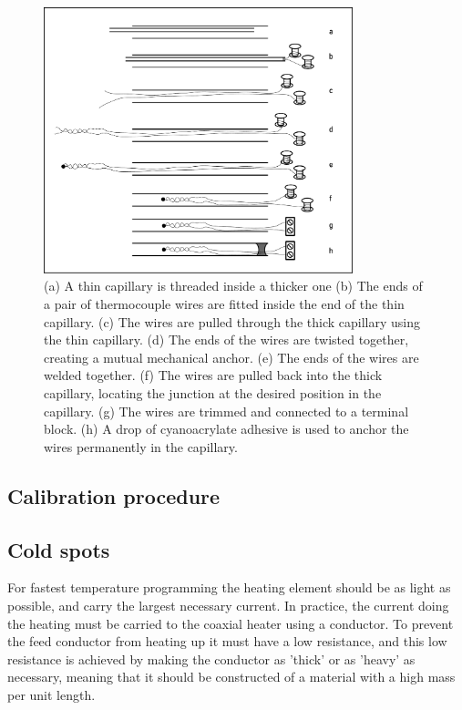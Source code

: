 \begin{figure}
	\centering
	\includegraphics[width=0.8\textwidth]{./Figures/FineWireThermocouple.pdf}
	\decoRule
	
\caption[A cartoon explaining how to construct a long, thin thermocouple
probe.]{(a) A thin capillary is threaded inside a thicker one (b) The ends of a
pair of thermocouple wires are fitted inside the end of the thin capillary. (c)
The wires are pulled through the thick capillary using the thin capillary. (d)
The ends of the wires are twisted together, creating a mutual mechanical anchor.
(e) The ends of the wires are welded together. (f) The wires are pulled back
into the thick capillary, locating the junction at the desired position in the
capillary. (g) The wires are trimmed and connected to a terminal block. (h) A
drop of cyanoacrylate adhesive is used to anchor the wires permanently in the
capillary. }
	
	\label{fig:FineWireThermocouple}
\end{figure}

\subsection{Calibration procedure}



\subsection{Cold spots}
\label{sec:ColdSpots}

For fastest temperature programming the heating element should be as light as
possible, and carry the largest necessary current. In practice, the current
doing the heating must be carried to the coaxial heater using a conductor. To
prevent the feed conductor from heating up it must have a low resistance, and
this low resistance is achieved by making the conductor as 'thick' or as 'heavy'
as necessary, meaning that it should be constructed of a material with a high
mass per unit length.

